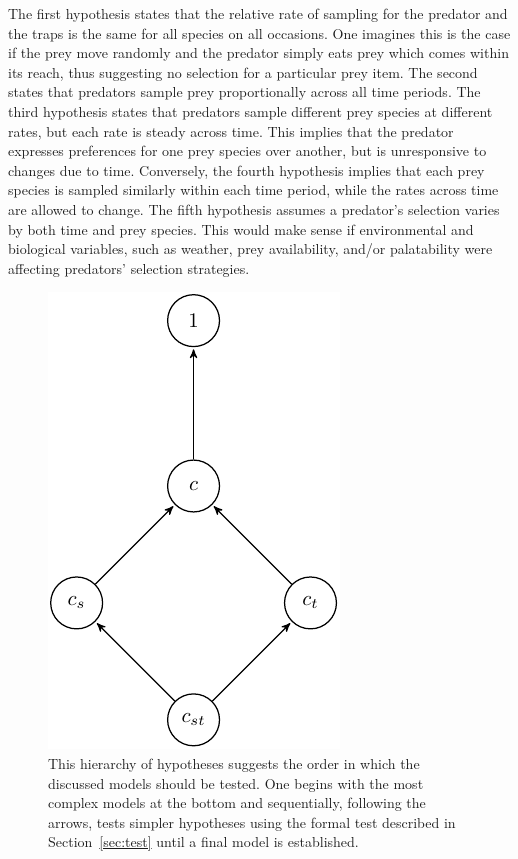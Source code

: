 \documentclass[smallextended]{svjour3}
\begin{document}
\noindent The first hypothesis states that the relative rate of sampling for the predator and the traps is the same for all species on all occasions.  One imagines this is the case if the prey move randomly and the predator simply eats prey which comes within its reach, thus suggesting no selection for a particular prey item.  The second states that predators sample prey proportionally across all time periods.  The third hypothesis states that predators sample different prey species at different rates, but each rate is steady across time.  This implies that the predator expresses preferences for one prey species over another, but is unresponsive to changes due to time.  Conversely, the fourth hypothesis implies that each prey species is sampled similarly within each time period, while the rates across time are allowed to change.  The fifth hypothesis assumes a predator's selection varies by both time and prey species.  This would make sense if environmental and biological variables, such as weather, prey availability, and/or palatability were affecting predators' selection strategies.  

\begin{figure}
  \centering
  \includegraphics{hyps.pdf}
  \caption{This hierarchy of hypotheses suggests the order in which the discussed models should be tested.  One begins with the most complex models at the bottom and sequentially, following the arrows, tests simpler hypotheses using the formal test described in Section~\ref{sec:test} until a final model is established.}
  \label{fig:hier}
\end{figure}
\end{document}
